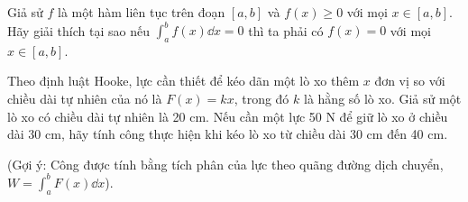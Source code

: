 \begin{exercise}[*]
    Giả sử $f$ là một hàm liên tục trên đoạn $[a, b]$ và $f(x) \ge 0$ với mọi $x \in [a, b]$. Hãy giải thích tại sao nếu $\int_{a}^{b} f(x) \dd x = 0$ thì ta phải có $f(x) = 0$ với mọi $x \in [a, b]$.
\end{exercise}

\begin{exercise}
    Theo định luật Hooke, lực cần thiết để kéo dãn một lò xo thêm $x$ đơn vị so với chiều dài tự nhiên của nó là $F(x) = kx$, trong đó $k$ là hằng số lò xo. Giả sử một lò xo có chiều dài tự nhiên là 20 cm. Nếu cần một lực 50 N để giữ lò xo ở chiều dài 30 cm, hãy tính công thực hiện khi kéo lò xo từ chiều dài 30 cm đến 40 cm.
    
    (Gợi ý: Công được tính bằng tích phân của lực theo quãng đường dịch chuyển, $W = \int_a^b F(x) \dd x$).
\end{exercise}
